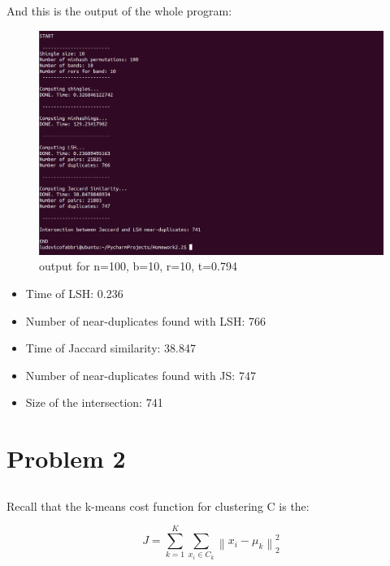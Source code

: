 \documentclass{article}
\newcommand{\norm}[1]{\left\lVert#1\right\rVert}
\begin{document}
\newpage

And this is the output of the whole program: \\

\begin{figure} [h]
\centering
\includegraphics[width=150mm]{output1010}
\caption{output for n=100, b=10, r=10, t=0.794  \label{wolfram1}}
\end{figure}

\begin{itemize}
	\item Time of LSH: 0.236
	\item Number of near-duplicates found with LSH: 766
	\item Time of Jaccard similarity: 38.847
	\item Number of near-duplicates found with JS: 747
	\item Size of the intersection: 741
\end{itemize}







\section{Problem 2}


\subsection{}
Recall that the k-means cost function for clustering C is the:

\begin{equation} \label{eq:objective_kmeans}
J = \sum_{k=1}^{K}  \sum_{x_{i} \in C_{k}}  \norm { x_{i} - \mu_{k} }^{2}_{2}
\end{equation}
\end{document}
